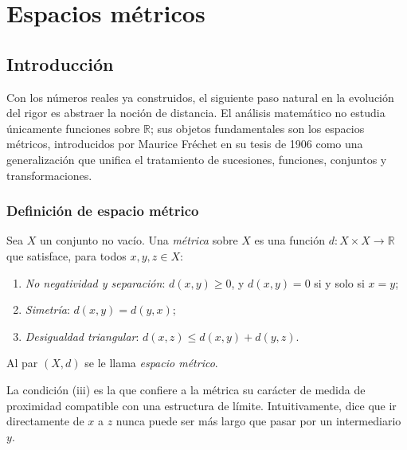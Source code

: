 \chapter{Espacios métricos}
\label{ch:espacios-metricos}

\section{Introducción}

Con los números reales ya construidos, el siguiente paso natural en la evolución del rigor es abstraer la noción de distancia. El análisis matemático no estudia únicamente funciones sobre $\mathbb{R}$; sus objetos fundamentales son los espacios métricos, introducidos por Maurice Fréchet en su tesis de 1906 como una generalización que unifica el tratamiento de sucesiones, funciones, conjuntos y transformaciones.

\subsection{Definición de espacio métrico}

\begin{definition}
\label{def:metrica}
Sea $X$ un conjunto no vacío. Una \emph{métrica} sobre $X$ es una función $d\colon X\times X\to\mathbb{R}$ que satisface, para todos $x,y,z\in X$:
\begin{enumerate}
  \item[(i)] \emph{No negatividad y separación}: $d(x,y)\geq 0$, y $d(x,y)=0$ si y solo si $x=y$;
  \item[(ii)] \emph{Simetría}: $d(x,y)=d(y,x)$;
  \item[(iii)] \emph{Desigualdad triangular}: $d(x,z)\leq d(x,y)+d(y,z)$.
\end{enumerate}
Al par $(X,d)$ se le llama \emph{espacio métrico}.
\end{definition}

La condición (iii) es la que confiere a la métrica su carácter de medida de proximidad compatible con una estructura de límite. Intuitivamente, dice que ir directamente de $x$ a $z$ nunca puede ser más largo que pasar por un intermediario $y$.

